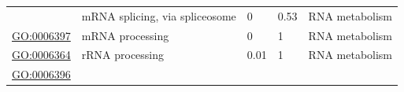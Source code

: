 \documentclass[
]{article}
\begin{document}
\begin{longtable}[]{@{}lllll@{}}
\begin{minipage}[t]{0.17\columnwidth}
\end{minipage} & \begin{minipage}[t]{0.17\columnwidth}\raggedright
mRNA splicing, via spliceosome\strut
\end{minipage} & \begin{minipage}[t]{0.17\columnwidth}\raggedright
0\strut
\end{minipage} & \begin{minipage}[t]{0.17\columnwidth}\raggedright
0.53\strut
\end{minipage} & \begin{minipage}[t]{0.17\columnwidth}\raggedright
RNA metabolism\strut
\end{minipage}\tabularnewline
\begin{minipage}[t]{0.17\columnwidth}\raggedright
\url{GO:0006397}\strut
\end{minipage} & \begin{minipage}[t]{0.17\columnwidth}\raggedright
mRNA processing\strut
\end{minipage} & \begin{minipage}[t]{0.17\columnwidth}\raggedright
0\strut
\end{minipage} & \begin{minipage}[t]{0.17\columnwidth}\raggedright
1\strut
\end{minipage} & \begin{minipage}[t]{0.17\columnwidth}\raggedright
RNA metabolism\strut
\end{minipage}\tabularnewline
\begin{minipage}[t]{0.17\columnwidth}\raggedright
\url{GO:0006364}\strut
\end{minipage} & \begin{minipage}[t]{0.17\columnwidth}\raggedright
rRNA processing\strut
\end{minipage} & \begin{minipage}[t]{0.17\columnwidth}\raggedright
0.01\strut
\end{minipage} & \begin{minipage}[t]{0.17\columnwidth}\raggedright
1\strut
\end{minipage} & \begin{minipage}[t]{0.17\columnwidth}\raggedright
RNA metabolism\strut
\end{minipage}\tabularnewline
\begin{minipage}[t]{0.17\columnwidth}\raggedright
\url{GO:0006396}\strut
\end{minipage} & \begin{minipage}[t]{0.17\columnwidth}\raggedright

\end{minipage}
\end{longtable}
\end{document}
